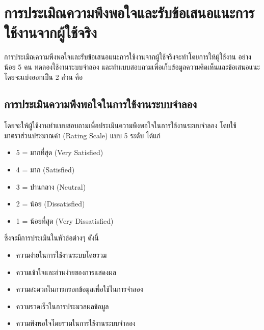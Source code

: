 \section{การประเมิณความพึงพอใจและรับข้อเสนอแนะการใช้งานจากผู้ใช้จริง}
\begin{mypara}
    \indent การประเมิณความพึงพอใจและรับข้อเสนอแนะการใช้งานจากผู้ใช้จริงจะทำโดยการให้ผู้ใช้งาน
    อย่างน้อย 5 คน ทดลองใช้งานระบบจำลอง และทำแบบสอบถามเพื่อเก็บข้อมูลความคิดเห็นและข้อเสนอแนะ
    โดยจะแบ่งออกเป็น 2 ส่วน คือ
    \subsection{การประเมินความพึงพอใจในการใช้งานระบบจำลอง}

        \begin{mypara}
            \indent โดยจะให้ผู้ใช้งานทำแบบสอบถามเพื่อประเมินความพึงพอใจในการใช้งานระบบจำลอง
            โดยใช้มาตราส่วนประมาณค่า (Rating Scale) แบบ 5 ระดับ ได้แก่
            \begin{itemize}
                \item 5 = มากที่สุด (Very Satisfied)
                \item 4 = มาก (Satisfied)
                \item 3 = ปานกลาง (Neutral)
                \item 2 = น้อย (Dissatisfied)
                \item 1 = น้อยที่สุด (Very Dissatisfied)
            \end{itemize}
            ซึ่งจะมีการประเมินในหัวข้อต่างๆ ดังนี้
            \begin{itemize}
                \item ความง่ายในการใช้งานระบบโดยรวม
                \item ความเข้าใจและอ่านง่ายของการแสดงผล
                \item ความสะดวกในการกรอกข้อมูลเพื่อใช้ในการจำลอง
                \item ความรวดเร็วในการประมวลผลข้อมูล
                \item ความพึงพอใจโดยรวมในการใช้งานระบบจำลอง
            \end{itemize}
        \end{mypara}
        \end{mypara}

